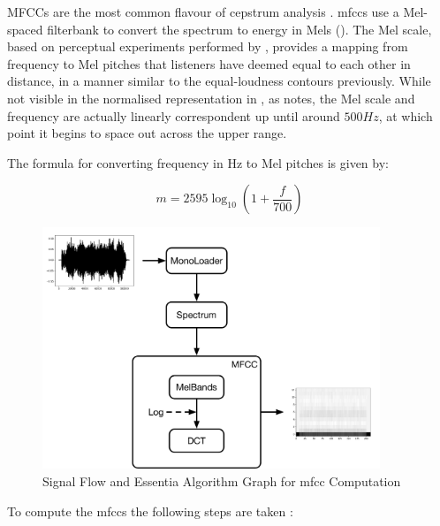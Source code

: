 {{MFCCs are the most common flavour of cepstrum analysis \citep{Kim2006}. \acrshort{mfcc}s use a Mel-spaced filterbank to convert the spectrum to energy in Mels (). The Mel scale, based on perceptual experiments performed by \cite{Stevens1937}, provides a mapping from frequency to Mel pitches that listeners have deemed equal to each other in distance, in a manner similar to the equal-loudness contours previously. While not visible in the normalised representation in , as \cite{Kim2006} notes, the Mel scale and frequency are actually linearly correspondent up until around $500Hz$, at which point it begins to space out across the upper range.

The formula for converting frequency in Hz to Mel pitches is given by:

  \begin{equation}
	\label{eq:mel}	
	m = 2595\log_10 (1+\frac{f}{700})
	\end{equation}
	
\begin{figure}
	\begin{center}
		\includegraphics[width=0.9\textwidth]{ch05_pyconcat/figures/mfcc_diagram.pdf}
	\end{center}
	\caption[Signal Flow and Essentia Algorithm Graph for MFCC Computation ]{Signal Flow and Essentia Algorithm Graph for \acrshort{mfcc} Computation }
	\label{fig:mfcc_diagram}
\end{figure}	

To compute the \acrshort{mfcc}s the following steps are taken \citep{Logan2000, Lyons2015}:

}}
